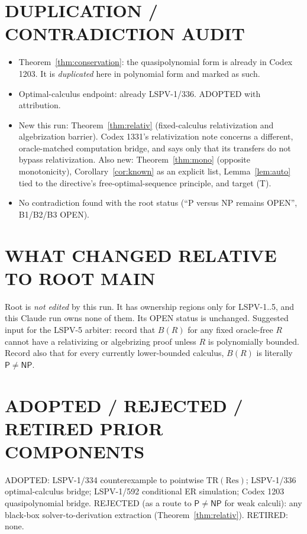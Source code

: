 \documentclass[11pt]{article}
\theoremstyle{definition}
\newcommand{\Pclass}{\mathsf{P}}
\newcommand{\NP}{\mathsf{NP}}
\begin{document}
\section*{DUPLICATION / CONTRADICTION AUDIT}
\begin{itemize}
\item Theorem~\ref{thm:conservation}: the quasipolynomial form is already in
Codex 1203. It is \emph{duplicated} here in polynomial form and marked as such.
\item Optimal-calculus endpoint: already LSPV-1/336. ADOPTED with attribution.
\item New this run: Theorem~\ref{thm:relativ} (fixed-calculus relativization and
algebrization barrier). Codex 1331's relativization note concerns a different,
oracle-matched computation bridge, and says only that its transfers do not
bypass relativization. Also new: Theorem~\ref{thm:mono} (opposite monotonicity),
Corollary~\ref{cor:known} as an explicit list, Lemma~\ref{lem:auto} tied to the
directive's free-optimal-sequence principle, and target (T).
\item No contradiction found with the root  status (``P versus
NP remains OPEN'', B1/B2/B3 OPEN).
\end{itemize}

\section*{WHAT CHANGED RELATIVE TO ROOT MAIN}
Root  is \emph{not edited} by this run. It has ownership regions
only for LSPV-1..5, and this Claude run owns none of them. Its OPEN status is
unchanged. Suggested input for the LSPV-5 arbiter: record that $B(R)$ for any
fixed oracle-free $R$ cannot have a relativizing or algebrizing proof unless
$R$ is polynomially bounded. Record also that for every currently lower-bounded
calculus, $B(R)$ is literally $\Pclass\ne\NP$.

\section*{ADOPTED / REJECTED / RETIRED PRIOR COMPONENTS}
ADOPTED: LSPV-1/334 counterexample to pointwise $\mathrm{TR}(\mathrm{Res})$;
LSPV-1/336 optimal-calculus bridge; LSPV-1/592 conditional ER simulation;
Codex 1203 quasipolynomial bridge.
REJECTED (as a route to $\Pclass\ne\NP$ for weak calculi): any black-box
solver-to-derivation extraction (Theorem~\ref{thm:relativ}).
RETIRED: none.
\end{document}
